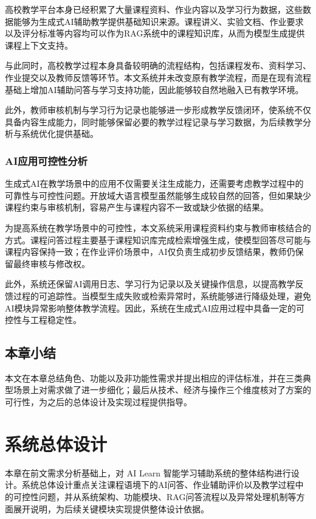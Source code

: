 \documentclass[12pt,a4paper,oneside]{ctexbook}
\numberwithin{equation}{chapter}
\begin{document}
高校教学平台本身已经积累了大量课程资料、作业内容以及学习行为数据，这些数据能够为生成式AI辅助教学提供基础知识来源。课程讲义、实验文档、作业要求以及评分标准等内容均可以作为RAG系统中的课程知识库，从而为模型生成提供课程上下文支持。

与此同时，高校教学过程本身具备较明确的流程结构，包括课程发布、资料学习、作业提交以及教师反馈等环节。本文系统并未改变原有教学流程，而是在现有流程基础上增加AI辅助问答与学习支持功能，因此能够较自然地融入已有教学环境。

此外，教师审核机制与学习行为记录也能够进一步形成教学反馈闭环，使系统不仅具备内容生成能力，同时能够保留必要的教学过程记录与学习数据，为后续教学分析与系统优化提供基础。

\subsection{AI应用可控性分析}

生成式AI在教学场景中的应用不仅需要关注生成能力，还需要考虑教学过程中的可靠性与可控性问题。开放域大语言模型虽然能够生成较自然的回答，但如果缺少课程约束与审核机制，容易产生与课程内容不一致或缺少依据的结果。

为提高系统在教学场景中的可控性，本文系统采用课程资料约束与教师审核结合的方式。课程问答过程主要基于课程知识库完成检索增强生成，使模型回答尽可能与课程内容保持一致；在作业评价场景中，AI仅负责生成初步反馈结果，教师仍保留最终审核与修改权。

此外，系统还保留AI调用日志、学习行为记录以及关键操作信息，以提高教学反馈过程的可追踪性。当模型生成失败或检索异常时，系统能够进行降级处理，避免AI模块异常影响整体教学流程。因此，系统在生成式AI应用过程中具备一定的可控性与工程稳定性。

\section{本章小结}
本文在本章总结角色、功能以及非功能性需求并提出相应的评估标准，并在三类典型场景上对需求做了进一步细化；最后从技术、经济与操作三个维度核对了方案的可行性，为之后的总体设计及实现过程提供指导。

\chapter{系统总体设计}

本章在前文需求分析基础上，对 AI Learn 智能学习辅助系统的整体结构进行设计。系统总体设计重点关注课程语境下的AI问答、作业辅助评价以及教学过程中的可控性问题，并从系统架构、功能模块、RAG问答流程以及异常处理机制等方面展开说明，为后续关键模块实现提供整体设计依据。
\end{document}
